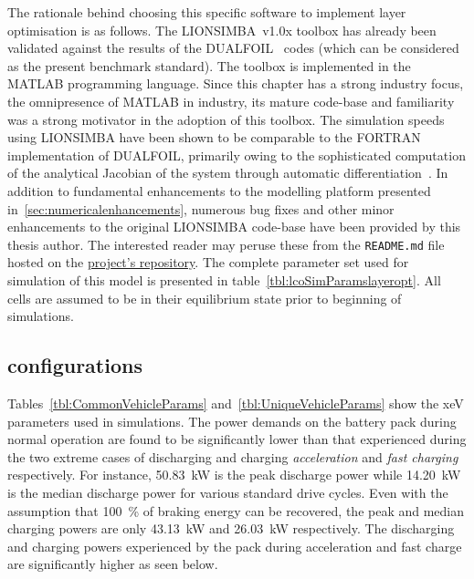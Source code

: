 The  rationale  behind  choosing  this  specific  software  to  implement  layer
optimisation  is  as  follows.  The LIONSIMBA~v1.0x  toolbox  has  already  been
validated against  the results of the  DUALFOIL~\cite{Dualfoil1998} codes (which
can be considered as the present benchmark standard). The toolbox is implemented
in the  MATLAB programming language.  Since this  chapter has a  strong industry
focus,  the  omnipresence  of  MATLAB  in industry,  its  mature  code-base  and
familiarity  was  a strong  motivator  in  the  adoption  of this  toolbox.  The
simulation  speeds using  LIONSIMBA  have been  shown to  be  comparable to  the
FORTRAN  implementation  of  DUALFOIL,  primarily  owing  to  the  sophisticated
computation  of  the  analytical  Jacobian   of  the  system  through  automatic
differentiation~\cite{Torchio2016}.  In  addition  to  fundamental  enhancements
to   the  modelling   platform  presented   in~\cref{sec:numericalenhancements},
numerous  bug fixes  and  other  minor enhancements  to  the original  LIONSIMBA
code-base   have  been   provided  by   this  thesis   author.  The   interested
reader  may  peruse  these  from  the  \texttt{README.md}  file  hosted  on  the
\href{https://github.com/lionsimbatoolbox/LIONSIMBA}{project's  repository}. The
complete  parameter set  used  for  simulation of  this  model  is presented  in
table~\ref{tbl:lcoSimParamslayeropt}.  All  cells are  assumed  to  be in  their
equilibrium state prior to beginning of simulations.



\subsection{ configurations}




Tables~\ref{tbl:CommonVehicleParams} and~\ref{tbl:UniqueVehicleParams}  show the
\gls{xeV}  parameters used  in simulations.  The  power demands  on the  battery
pack  during  normal  operation  are   found  to  be  significantly  lower  than
that  experienced during  the  two  extreme cases  of  discharging and  charging
\viz{} \emph{acceleration} and \emph{fast  charging} respectively. For instance,
\SI{50.83}{\kilo\watt} is the peak  discharge power while \SI{14.20}{\kilo\watt}
is  the median  discharge power  for various  standard drive  cycles. Even  with
the  assumption that  \SI{100}{\percent}  of braking  energy  can be  recovered,
the  peak  and  median  charging  powers  are  only  \SI{43.13}{\kilo\watt}  and
\SI{26.03}{\kilo\watt}  respectively.   The  discharging  and   charging  powers
experienced by  the pack during  acceleration and fast charge  are significantly
higher as seen below.

